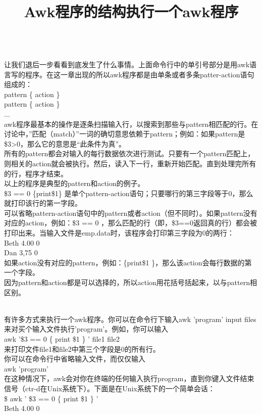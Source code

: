 \documentclass[10pt,fancyhdr,UTF-8]{ctexart}
\begin{document}
\title{\textbf{Awk程序的结构}} \\
让我们退后一步看看到底发生了什么事情。上面命令行中的单引号部分是用awk语言写的程序。在这一章出现的所以awk程序都是由单条或者多条patter-action语句组成的：\\
pattern    \{ action  \}  \\
pattern    \{ action  \}  \\
... \\
awk程序最基本的操作是逐条扫描输入行，以搜索到那些与pattern相匹配的行。在讨论中，”匹配（match）”一词的确切意思依赖于pattern；例如：如果pattern是\$3>0，那么它的意思是“此条件为真”。 \\
所有的pattern都会对输入的每行数据依次进行测试。只要有一个pattern匹配上，则相关的action就会被执行。然后，读入下一行，重新开始匹配。直到处理完所有的行，程序才结束。 \\
以上的程序是典型的pattern和action的例子。 \\
\$3 == 0 \{print\$1\} 是单个pattern-action语句；只要哪行的第三字段等于0，那么就打印该行的第一字段。 \\
可以省略pattern-action语句中的pattern或者action（但不同时）。如果pattern没有对应的action，例如：\$3 == 0 ，那么匹配的行（即，\$3==0返回真的行）都会被打印出来。当输入文件是emp.data时，该程序会打印第三字段为0的两行： \\
\indent Beth   4.00    0 \\
\indent Dan    3,75    0 \\
如果action没有对应的pattern，例如：\{print\$1 \}，那么该action会每行数据的第一个字段。 \\
因为pattern和action都是可以选择的，所以action用花括号括起来，以与pattern相区别。 \\
\indent \title{\textbf{执行一个awk程序}} \\
有许多方式来执行一个awk程序。你可以在命令行下输入awk  'program' input files来对买个输入文件执行'program'。例如，你可以输入 \\
awk  '\$3 == 0 \{ print \$1 \} '  file1  file2  \\
来打印文件file1和file2中第三个字段是0的所有行。\\
你可以在命令行中省略输入文件，而仅仅输入 \\
awk  'program' \\
在这种情况下，awk会对你在终端的任何输入执行program，直到你键入文件结束信号（ctr-d在Unix系统下）。下面是在Unix系统下的一个简单会话： \\
\$ awk  ' \$3 == 0 \{  print  \$1  \} '  \\
Beth      4.00      0 \\
\end{document}
